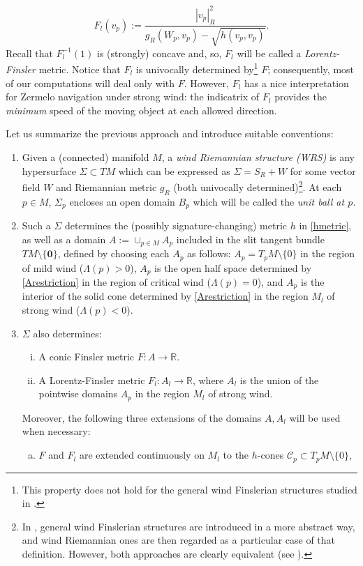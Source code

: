 \documentclass[reqno,10pt]{amsart}
\newcommand{\R}{\mathds R}
\newcommand{\C}{\mathcal{C}}
\begin{document}
\begin{equation}\label{lorentzF}
F_l(v_p):=   \frac{|v_p|_R^2}
{g_R(W_p,v_p)-\sqrt{h(v_p,v_p)}}.
\end{equation}
Recall that $F_l^{-1}(1)$
 is  (strongly) concave and, so,  $F_l$ will be 
called a {\em Lorentz-Finsler} metric.
Notice that $F_l$ is univocally determined by\footnote{This property does not hold for the general wind Finslerian structures studied in \cite{CJSwind}.} $F$; consequently, most of our computations will deal only with $F$. However, $F_l$  has a nice interpretation for Zermelo navigation under strong wind: the indicatrix of $F_l$ provides the {\em minimum} speed of the moving object at each allowed direction.

Let us summarize the previous approach and introduce suitable conventions:
\begin{enumerate}
\item Given a (connected) manifold $M$, a {\em wind Riemannian structure (WRS)} is any hypersurface $\Sigma \subset TM$ which can be expressed as $\Sigma= S_R+W$ for some vector field $W$ and Riemannian metric $g_R$ (both  univocally determined)\footnote{In \cite{CJSwind},  general wind Finslerian structures are introduced in a more abstract way, and wind Riemannian ones are then regarded as a particular case of that definition. However, both approaches are clearly equivalent  (see \cite[Prop. 2.13]{CJSwind}). }. At each $p\in M$, $\Sigma_p$ encloses an open domain $B_p$ which will be called the {\em unit ball at $p$.}

\item Such a  $\Sigma$ determines the (possibly signature-changing) metric $h$ in \eqref{hmetric}, as well as a  domain $A:=\cup_{p\in M}A_p$ included in the slit tangent bundle $TM\setminus\{\mathbf{0}\}$, defined by choosing each $A_p$ as follows: $A_p=T_pM\setminus\{0\}$ 
in the region of mild wind ($\Lambda(p)>0$), $A_p$ is the open half space determined by \eqref{Arestriction} in the region of critical wind ($\Lambda(p)=0$), and $A_p$ is the interior of the solid cone determined by \eqref{Arestriction} in the region $M_l$ of strong wind ($\Lambda(p)<0$). 

\item $\Sigma$ also determines:
\begin{enumerate}[(i)]
\item A conic Finsler metric  $F:
A\rightarrow \R$.  
\item A Lorentz-Finsler metric  $F_l:
A_l\rightarrow \R$,  where $A_l$ is the union of the pointwise domains $A_p$ in the region $M_l$ of strong wind.
\end{enumerate}
Moreover, the following three extensions of the domains $A, A_l$ will be used when necessary: 
\begin{enumerate}[(a)]
\item $F$ and $F_l$ are extended continuously on 
$M_l$ to the $h$-cones $\C_p \subset T_pM\setminus\{0\}$,


\end{enumerate}
\end{enumerate}
\end{document}

